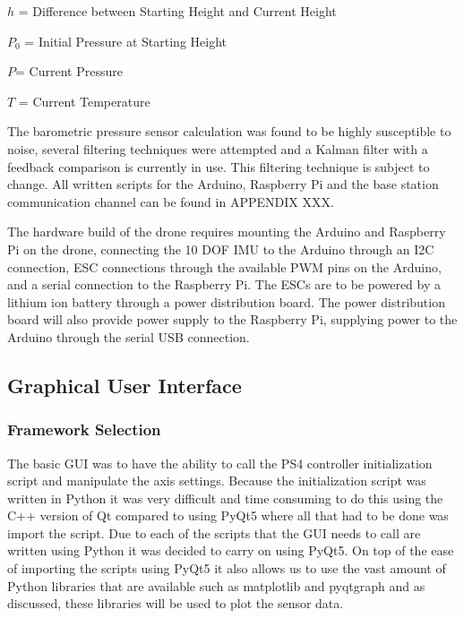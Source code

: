 $h$ = Difference between Starting Height and Current Height

$P_{0}$ = Initial Pressure at Starting Height

$P$= Current Pressure

$T$ = Current Temperature

\vspace*{0.2in}

The barometric pressure sensor calculation was found to be highly susceptible to noise, several filtering techniques were attempted and a Kalman filter with a feedback comparison is currently in use. This filtering technique is subject to change. All written scripts for the Arduino, Raspberry Pi and the base station communication channel can be found in APPENDIX XXX. 

The hardware build of the drone requires mounting the Arduino and Raspberry Pi on the drone, connecting the 10 DOF IMU to the Arduino through an I2C connection, ESC connections through the available PWM pins on the Arduino, and a serial connection to the Raspberry Pi. The ESCs are to be powered by a lithium ion battery through a power distribution board. The power distribution board will also provide power supply to the Raspberry Pi, supplying power to the Arduino through the serial USB connection.


\subsection{Graphical User Interface}
\subsubsection{Framework Selection}
The basic GUI was to have the ability to call the PS4 controller initialization script and manipulate the axis settings. Because the initialization script was written in Python it was very difficult and time consuming to do this using the C++ version of Qt compared to using PyQt5 where all that had to be done was import the script. Due to each of the scripts that the GUI needs to call are written using Python it was decided to carry on using PyQt5. On top of the ease of importing the scripts using PyQt5 it also allows us to use the vast amount of Python libraries that are available such as matplotlib and pyqtgraph and as discussed, these libraries will be used to plot the sensor data. 
